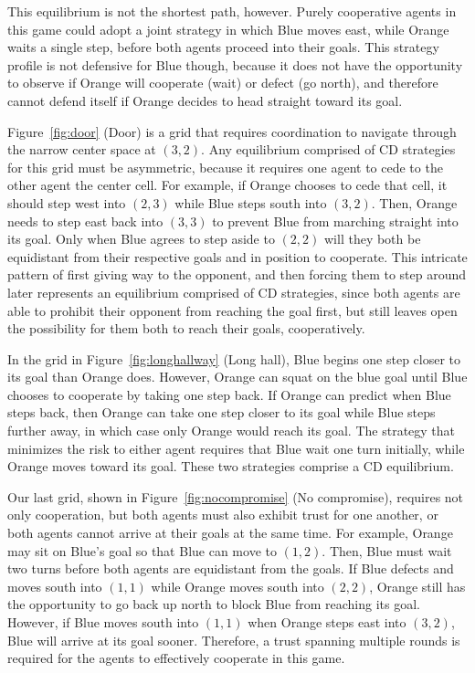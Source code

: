 This equilibrium is not the shortest path, however.
%
Purely cooperative agents in this game could adopt a joint strategy in
which Blue moves east, while Orange waits a single step, before both
agents proceed into their goals.  This strategy profile is not
defensive for Blue though, because it does not have the opportunity to
observe if Orange will cooperate (wait) or defect (go north), and
therefore cannot defend itself if Orange decides to head straight
toward its goal.


Figure~\ref{fig:door} (Door) is a grid that requires coordination to
navigate through the narrow center space at $(3,2)$. Any
equilibrium comprised of CD strategies for this grid must be asymmetric,
because it requires one agent to cede to the other agent the center
cell. For example, if Orange chooses to cede that cell, it should step
west into $(2,3)$ while Blue steps south into $(3,2)$. Then, Orange
needs to step east back into $(3,3)$ to prevent Blue from marching
straight into its goal. Only when Blue agrees to step aside to $(2,2)$
will they both be equidistant from their respective goals and in
position to cooperate.
%
This intricate pattern of first giving way to the opponent, and then
forcing them to step around later represents an equilibrium comprised
of CD strategies, since both agents are able to prohibit their
opponent from reaching the goal first, but still leaves open the
possibility for them both to reach their goals, cooperatively.

In the grid in Figure~\ref{fig:longhallway} (Long hall), Blue begins
one step closer to its goal than Orange does.  However, Orange can
squat on the blue goal until Blue chooses to cooperate by taking one
step back. If Orange can predict when Blue steps back, then Orange can
take one step closer to its goal while Blue steps further away, in
which case only Orange would reach its goal.  The strategy that
minimizes the risk to either agent requires that Blue wait one turn
initially, while Orange moves toward its goal.  These two strategies
comprise a CD equilibrium.

Our last grid, shown in Figure~\ref{fig:nocompromise} (No compromise),
requires not only cooperation, but both agents must also exhibit trust
for one another, or both agents cannot arrive at their goals at the
same time.  For example, Orange may sit on Blue's goal so that Blue
can move to $(1,2)$.  Then, Blue must wait two turns before both
agents are equidistant from the goals.  If Blue defects and moves
south into $(1,1)$ while Orange moves south into $(2,2)$, Orange still
has the opportunity to go back up north to block Blue from reaching
its goal.  However, if Blue moves south into $(1,1)$ when Orange steps
east into $(3,2)$, Blue will arrive at its goal sooner.  Therefore, a
trust spanning multiple rounds is required for the agents to
effectively cooperate in this game.

